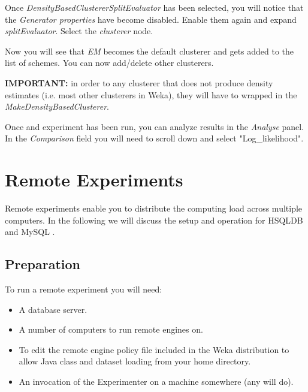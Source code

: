 \noindent Once \textit{DensityBasedClustererSplitEvaluator} has been selected, you will
notice that the \textit{Generator properties} have become disabled. Enable them
again and expand \textit{splitEvaluator}. Select the \textit{clusterer} node.
\begin{center}
\end{center}

\noindent Now you will see that \textit{EM} becomes the default clusterer and gets added
to the list of schemes. You can now add/delete other clusterers.

\noindent \textbf{IMPORTANT:} in order to
any clusterer that does not produce density estimates (i.e. most other
clusterers in Weka), they will have to wrapped in the
\textit{MakeDensityBasedClusterer}.
\begin{center}
\end{center}

\noindent Once and experiment has been run, you can analyze results in the
\textit{Analyse} panel. In the \textit{Comparison} field you will need to scroll
down and select "Log\_likelihood".
\begin{center}
\end{center}


\newpage
\section{Remote Experiments}

Remote experiments enable you to distribute the computing load across multiple computers. In the following we will discuss the setup and operation for HSQLDB \cite{hsql} and MySQL \cite{mysql}.

\subsection{Preparation}

To run a remote experiment you will need:

\begin{itemize}
   \item A database server.
   \item A number of computers to run remote engines on.
   \item To edit the remote engine policy file included in the Weka distribution to allow Java class and dataset loading from your home directory.
   \item An invocation of the Experimenter on a machine somewhere (any will do).
\end{itemize}

